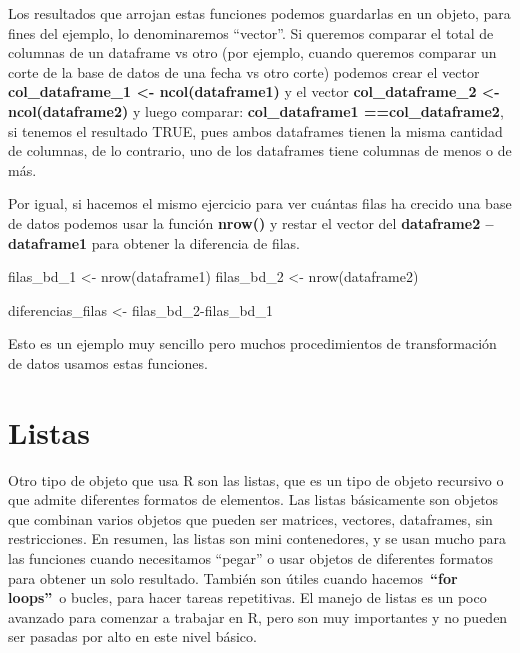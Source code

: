 \documentclass[
  letterpaper,
  DIV=11,
  numbers=noendperiod]{scrreprt}
\newenvironment{Shaded}{\begin{snugshade}}{\end{snugshade}}
\newcommand{\FunctionTok}[1]{\textcolor[rgb]{0.28,0.35,0.67}{#1}}
\newcommand{\NormalTok}[1]{\textcolor[rgb]{0.00,0.23,0.31}{#1}}
\newcommand{\OtherTok}[1]{\textcolor[rgb]{0.00,0.23,0.31}{#1}}
\newcommand{\SpecialCharTok}[1]{\textcolor[rgb]{0.37,0.37,0.37}{#1}}
\begin{document}
Los resultados que arrojan estas funciones podemos guardarlas en un
objeto, para fines del ejemplo, lo denominaremos ``vector''. Si queremos
comparar el total de columnas de un dataframe vs otro (por ejemplo,
cuando queremos comparar un corte de la base de datos de una fecha vs
otro corte) podemos crear el vector \textbf{col\_dataframe\_1 \textless-
ncol(dataframe1)} y el vector \textbf{col\_dataframe\_2 \textless-
ncol(dataframe2)} y luego comparar: \textbf{col\_dataframe1
==col\_dataframe2}, si tenemos el resultado TRUE, pues ambos dataframes
tienen la misma cantidad de columnas, de lo contrario, uno de los
dataframes tiene columnas de menos o de más.

Por igual, si hacemos el mismo ejercicio para ver cuántas filas ha
crecido una base de datos podemos usar la función \textbf{nrow()} y
restar el vector del \textbf{dataframe2 -- dataframe1} para obtener la
diferencia de filas.

\begin{Shaded}
\begin{Highlighting}[]
\NormalTok{filas\_bd\_1 }\OtherTok{\textless{}{-}} \FunctionTok{nrow}\NormalTok{(dataframe1)}
\NormalTok{filas\_bd\_2 }\OtherTok{\textless{}{-}} \FunctionTok{nrow}\NormalTok{(dataframe2)}

\NormalTok{diferencias\_filas }\OtherTok{\textless{}{-}}\NormalTok{ filas\_bd\_2}\SpecialCharTok{{-}}\NormalTok{filas\_bd\_1}
\end{Highlighting}
\end{Shaded}

Esto es un ejemplo muy sencillo pero muchos procedimientos de
transformación de datos usamos estas funciones.

\section{Listas}\label{listas}

Otro tipo de objeto que usa R son las listas, que es un tipo de objeto
recursivo o que admite diferentes formatos de elementos. Las listas
básicamente son objetos que combinan varios objetos que pueden ser
matrices, vectores, dataframes, sin restricciones. En resumen, las
listas son mini contenedores, y se usan mucho para las funciones cuando
necesitamos ``pegar'' o usar objetos de diferentes formatos para obtener
un solo resultado. También son útiles cuando hacemos~\textbf{``for
loops''}~o bucles, para hacer tareas repetitivas. El manejo de listas es
un poco avanzado para comenzar a trabajar en R, pero son muy importantes
y no pueden ser pasadas por alto en este nivel básico.
\end{document}
